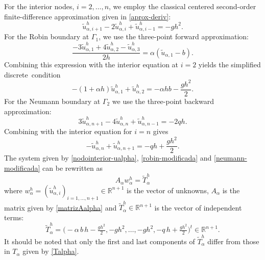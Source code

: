 \documentclass[axioms,article,submit,moreauthors]{Definitions/mdpi}
\begin{document}
For the interior nodes, $i=2,\dots,n$, we employ the classical centered second-order finite-difference approximation given in \eqref{aprox-deriv}:
\begin{equation}\label{nodointerior-ualpha}
{\widetilde{u}^h_{\alpha,i+1}-2\widetilde{u}^h_{\alpha,i}+\widetilde{u}^h_{\alpha,i-1}}=-g h^2.
\end{equation}
For the Robin boundary at $\Gamma_1$, we use the three-point forward approximation:
\begin{equation}
{\frac{-3 \widetilde{u}^h_{\alpha,1} + 4 \widetilde{u}^h_{\alpha,2} - \widetilde{u}^h_{\alpha,3}}{2h}} = \alpha (\widetilde{u}_{\alpha,1}-b).
\end{equation} 
Combining this expression with the interior equation at $i=2$ yields the simplified \mbox{discrete~condition}
\begin{equation}\label{robin-modificada}
{-(1+\alpha h)\widetilde{u}^h_{\alpha,1} + \widetilde{u}^h_{\alpha,2}} =- \alpha h b -\frac{g h^2}{2}.
\end{equation}
For the Neumann boundary at $\Gamma_2$ we use the three-point backward approximation:
\begin{equation}
{3\widetilde{u}^h_{\alpha,n+1}-4\widetilde{u}^h_{\alpha,n}+\widetilde{u}^h_{\alpha,n-1}}=-2 q h.
\end{equation}
Combining with the interior equation for $i=n$ gives
\begin{equation} \label{neumann-modificada}
{-\widetilde{u}^h_{\alpha,n}+\widetilde{u}^h_{\alpha,n+1}}=-q h + \frac{g h^2}{2}.
\end{equation}
The system given by \eqref{nodointerior-ualpha}, \eqref{robin-modificada} and \eqref{neumann-modificada} can be rewritten as 
\begin{equation}\label{sistemaalpha-nuevo}
{ A_\alpha w^h_\alpha=\widetilde{T}^h_\alpha}
\end{equation}
where ${ w^h_\alpha} = ({\widetilde{u}^h_{\alpha, i}})_{i=1,\ldots,n+1}\in\mathbb{R}^{n+1}$ is the vector of unknowns, $A_\alpha$ is the matrix given by \eqref{matrizAalpha} and   ${\widetilde{T}^h_\alpha}\in \mathbb{R}^{n+1}$ is  the vector of independent terms:
   \begin{equation}\label{Talpha*}
 {\widetilde{T}^h_\alpha}= \Big(-\alpha\,b\,h-\tfrac{gh^2}{2}, -g h^2, \ldots, -g h^2, -q\,h+\tfrac{gh^2}{2}  \Big)^t \in  \mathbb{R}^{n+1}.
  \end{equation}
It should be noted that only the first and last components of \({\widetilde{T}^h_\alpha}\)  differ from those in \(T_\alpha\) given by \eqref{Talpha}.
  
\end{document}
